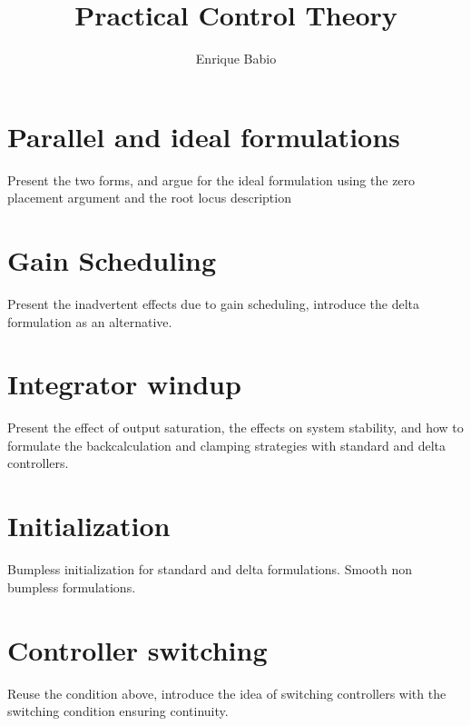 \documentclass{article}
\title{Practical Control Theory}
\author{Enrique Babio}
\begin{document}
	
	\maketitle
	
	
	
	\section{Parallel and ideal formulations}
	Present the two forms, and argue for the ideal formulation using the zero placement argument and the root locus description
	\section{Gain Scheduling}
	Present the inadvertent effects due to gain scheduling, introduce the delta formulation as an alternative.
	\section{Integrator windup}
	Present the effect of output saturation, the effects on system stability, and how to formulate the backcalculation and clamping strategies with standard and delta controllers.
	\section{Initialization}
	Bumpless initialization for standard and delta formulations. Smooth non bumpless formulations.
	\section{Controller switching}
	Reuse the condition above, introduce the idea of switching controllers with the switching condition ensuring continuity.
	
	\newpage
	\begin{appendices}
		
	\end{appendices}
	
	
	
\end{document}
